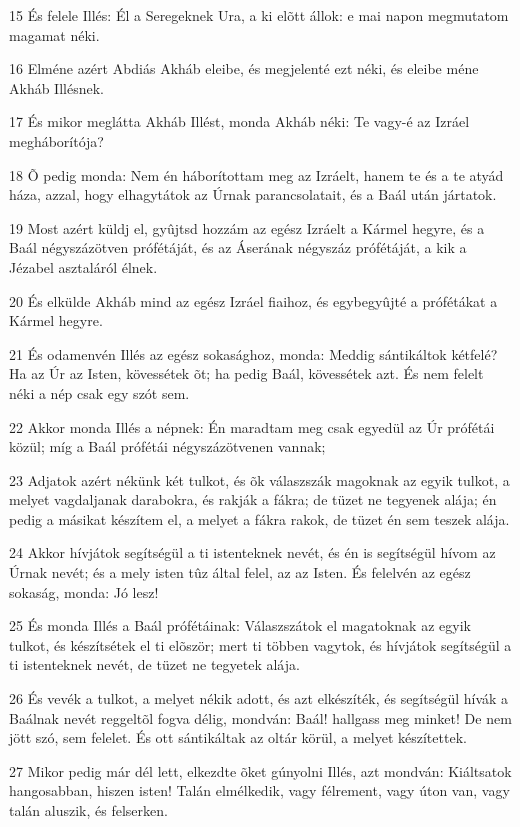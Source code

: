 \par 15 És felele Illés: Él a Seregeknek Ura, a ki elõtt állok: e mai napon megmutatom magamat néki.
\par 16 Elméne azért Abdiás Akháb eleibe, és megjelenté ezt néki, és eleibe méne Akháb Illésnek.
\par 17 És mikor meglátta Akháb Illést, monda Akháb néki: Te vagy-é az Izráel megháborítója?
\par 18 Õ pedig monda: Nem én háborítottam meg az Izráelt, hanem te és a te atyád háza, azzal, hogy elhagytátok az Úrnak parancsolatait, és a Baál után jártatok.
\par 19 Most azért küldj el, gyûjtsd hozzám az egész Izráelt a Kármel hegyre, és a Baál négyszázötven prófétáját, és az Áserának négyszáz prófétáját, a kik a Jézabel asztaláról élnek.
\par 20 És elkülde Akháb mind az egész Izráel fiaihoz, és egybegyûjté a prófétákat a Kármel hegyre.
\par 21 És odamenvén Illés az egész sokasághoz, monda: Meddig sántikáltok kétfelé? Ha az Úr az Isten, kövessétek õt; ha pedig Baál, kövessétek azt. És nem felelt néki a nép csak egy szót sem.
\par 22 Akkor monda Illés a népnek: Én maradtam meg csak egyedül az Úr prófétái közül; míg a Baál prófétái négyszázötvenen vannak;
\par 23 Adjatok azért nékünk két tulkot, és õk válaszszák magoknak az egyik tulkot, a melyet vagdaljanak darabokra, és rakják a fákra; de tüzet ne tegyenek alája; én pedig a másikat készítem el, a melyet a fákra rakok, de tüzet én sem teszek alája.
\par 24 Akkor hívjátok segítségül a ti istenteknek nevét, és én is segítségül hívom az Úrnak nevét; és a mely isten tûz által felel, az az Isten. És felelvén az egész sokaság, monda: Jó lesz!
\par 25 És monda Illés a Baál prófétáinak: Válaszszátok el magatoknak az egyik tulkot, és készítsétek el ti elõször; mert ti többen vagytok, és hívjátok segítségül a ti istenteknek nevét, de tüzet ne tegyetek alája.
\par 26 És vevék a tulkot, a melyet nékik adott, és azt elkészíték, és segítségül hívák a Baálnak nevét reggeltõl fogva délig, mondván: Baál! hallgass meg minket! De nem jött szó, sem felelet. És ott sántikáltak az oltár körül, a melyet készítettek.
\par 27 Mikor pedig már dél lett, elkezdte õket gúnyolni Illés, azt mondván: Kiáltsatok hangosabban, hiszen isten! Talán elmélkedik, vagy félrement, vagy úton van, vagy talán aluszik, és felserken.
